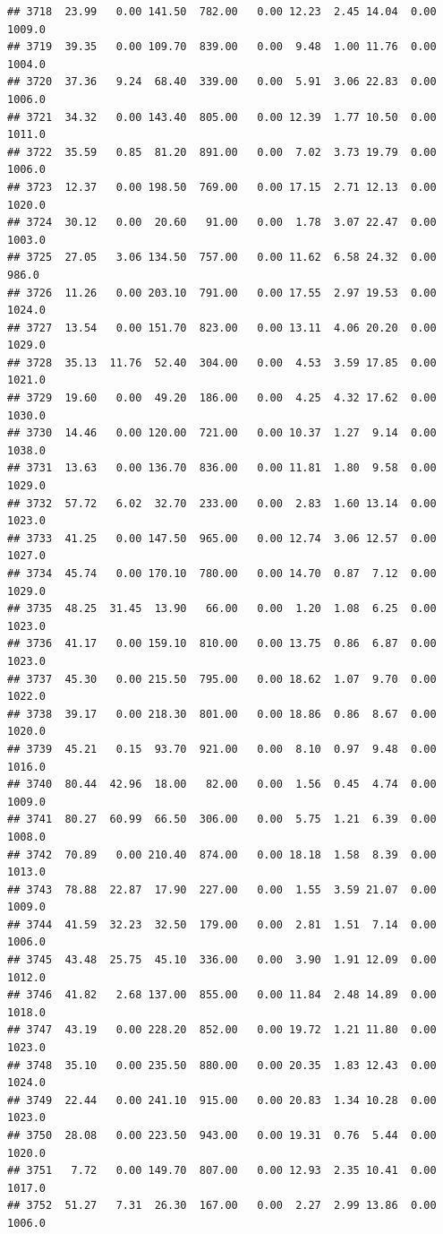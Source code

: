 \documentclass{article}\usepackage{graphicx, color}
\makeatletter
\newenvironment{kframe}{%
 \def\at@end@of@kframe{}%
 \ifinner\ifhmode%
  \def\at@end@of@kframe{\end{minipage}}%
  \begin{minipage}{\columnwidth}%
 \fi\fi%
 \def\FrameCommand##1{\hskip\@totalleftmargin \hskip-\fboxsep
 \colorbox{shadecolor}{##1}\hskip-\fboxsep
     \hskip-\linewidth \hskip-\@totalleftmargin \hskip\columnwidth}%
 \MakeFramed {\advance\hsize-\width
   \@totalleftmargin\z@ \linewidth\hsize
   \@setminipage}}%
 {\par\unskip\endMakeFramed%
 \at@end@of@kframe}
\newenvironment{knitrout}{}{} %
\makeatother
\begin{document}
\begin{knitrout}
\begin{kframe}
\begin{verbatim}
## 3718  23.99   0.00 141.50  782.00   0.00 12.23  2.45 14.04  0.00 1009.0
## 3719  39.35   0.00 109.70  839.00   0.00  9.48  1.00 11.76  0.00 1004.0
## 3720  37.36   9.24  68.40  339.00   0.00  5.91  3.06 22.83  0.00 1006.0
## 3721  34.32   0.00 143.40  805.00   0.00 12.39  1.77 10.50  0.00 1011.0
## 3722  35.59   0.85  81.20  891.00   0.00  7.02  3.73 19.79  0.00 1006.0
## 3723  12.37   0.00 198.50  769.00   0.00 17.15  2.71 12.13  0.00 1020.0
## 3724  30.12   0.00  20.60   91.00   0.00  1.78  3.07 22.47  0.00 1003.0
## 3725  27.05   3.06 134.50  757.00   0.00 11.62  6.58 24.32  0.00  986.0
## 3726  11.26   0.00 203.10  791.00   0.00 17.55  2.97 19.53  0.00 1024.0
## 3727  13.54   0.00 151.70  823.00   0.00 13.11  4.06 20.20  0.00 1029.0
## 3728  35.13  11.76  52.40  304.00   0.00  4.53  3.59 17.85  0.00 1021.0
## 3729  19.60   0.00  49.20  186.00   0.00  4.25  4.32 17.62  0.00 1030.0
## 3730  14.46   0.00 120.00  721.00   0.00 10.37  1.27  9.14  0.00 1038.0
## 3731  13.63   0.00 136.70  836.00   0.00 11.81  1.80  9.58  0.00 1029.0
## 3732  57.72   6.02  32.70  233.00   0.00  2.83  1.60 13.14  0.00 1023.0
## 3733  41.25   0.00 147.50  965.00   0.00 12.74  3.06 12.57  0.00 1027.0
## 3734  45.74   0.00 170.10  780.00   0.00 14.70  0.87  7.12  0.00 1029.0
## 3735  48.25  31.45  13.90   66.00   0.00  1.20  1.08  6.25  0.00 1023.0
## 3736  41.17   0.00 159.10  810.00   0.00 13.75  0.86  6.87  0.00 1023.0
## 3737  45.30   0.00 215.50  795.00   0.00 18.62  1.07  9.70  0.00 1022.0
## 3738  39.17   0.00 218.30  801.00   0.00 18.86  0.86  8.67  0.00 1020.0
## 3739  45.21   0.15  93.70  921.00   0.00  8.10  0.97  9.48  0.00 1016.0
## 3740  80.44  42.96  18.00   82.00   0.00  1.56  0.45  4.74  0.00 1009.0
## 3741  80.27  60.99  66.50  306.00   0.00  5.75  1.21  6.39  0.00 1008.0
## 3742  70.89   0.00 210.40  874.00   0.00 18.18  1.58  8.39  0.00 1013.0
## 3743  78.88  22.87  17.90  227.00   0.00  1.55  3.59 21.07  0.00 1009.0
## 3744  41.59  32.23  32.50  179.00   0.00  2.81  1.51  7.14  0.00 1006.0
## 3745  43.48  25.75  45.10  336.00   0.00  3.90  1.91 12.09  0.00 1012.0
## 3746  41.82   2.68 137.00  855.00   0.00 11.84  2.48 14.89  0.00 1018.0
## 3747  43.19   0.00 228.20  852.00   0.00 19.72  1.21 11.80  0.00 1023.0
## 3748  35.10   0.00 235.50  880.00   0.00 20.35  1.83 12.43  0.00 1024.0
## 3749  22.44   0.00 241.10  915.00   0.00 20.83  1.34 10.28  0.00 1023.0
## 3750  28.08   0.00 223.50  943.00   0.00 19.31  0.76  5.44  0.00 1020.0
## 3751   7.72   0.00 149.70  807.00   0.00 12.93  2.35 10.41  0.00 1017.0
## 3752  51.27   7.31  26.30  167.00   0.00  2.27  2.99 13.86  0.00 1006.0

\end{verbatim}
\end{kframe}
\end{knitrout}
\end{document}

